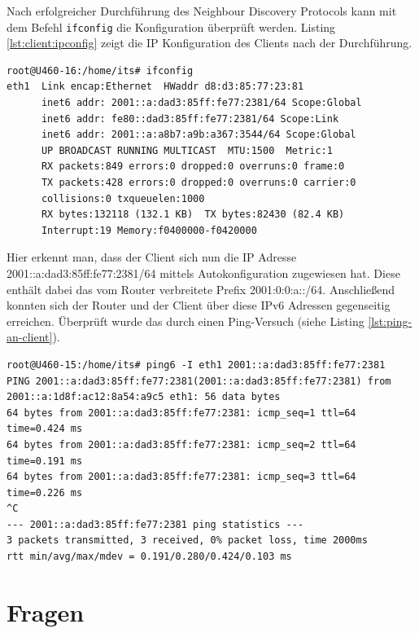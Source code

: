 \documentclass[a4paper,12pt]{article} %
\begin{document}
Nach erfolgreicher Durchführung des Neighbour Discovery Protocols kann mit dem Befehl \verb!ifconfig! die Konfiguration überprüft werden. Listing \ref{lst:client:ipconfig} zeigt die IP Konfiguration des Clients nach der Durchführung.

\begin{lstlisting}[style=code,caption={IP Konfiguration des Clients},label=lst:client:ipconfig]
root@U460-16:/home/its# ifconfig
eth1  Link encap:Ethernet  HWaddr d8:d3:85:77:23:81  
      inet6 addr: 2001::a:dad3:85ff:fe77:2381/64 Scope:Global
      inet6 addr: fe80::dad3:85ff:fe77:2381/64 Scope:Link
      inet6 addr: 2001::a:a8b7:a9b:a367:3544/64 Scope:Global
      UP BROADCAST RUNNING MULTICAST  MTU:1500  Metric:1
      RX packets:849 errors:0 dropped:0 overruns:0 frame:0
      TX packets:428 errors:0 dropped:0 overruns:0 carrier:0
      collisions:0 txqueuelen:1000 
      RX bytes:132118 (132.1 KB)  TX bytes:82430 (82.4 KB)
      Interrupt:19 Memory:f0400000-f0420000  
\end{lstlisting}

Hier erkennt man, dass der Client sich nun die IP Adresse 2001::a:dad3:85ff:fe77:2381/64 mittels Autokonfiguration zugewiesen hat. Diese enthält dabei das vom Router verbreitete Prefix 2001:0:0:a::/64.
Anschließend konnten sich der Router und der Client über diese IPv6 Adressen gegenseitig erreichen. Überprüft wurde das durch einen Ping-Versuch (siehe Listing \ref{lst:ping-an-client}).

\begin{lstlisting}[style=code,caption={Ping an Client},label=lst:ping-an-client]
root@U460-15:/home/its# ping6 -I eth1 2001::a:dad3:85ff:fe77:2381
PING 2001::a:dad3:85ff:fe77:2381(2001::a:dad3:85ff:fe77:2381) from 2001::a:1d8f:ac12:8a54:a9c5 eth1: 56 data bytes
64 bytes from 2001::a:dad3:85ff:fe77:2381: icmp_seq=1 ttl=64 time=0.424 ms
64 bytes from 2001::a:dad3:85ff:fe77:2381: icmp_seq=2 ttl=64 time=0.191 ms
64 bytes from 2001::a:dad3:85ff:fe77:2381: icmp_seq=3 ttl=64 time=0.226 ms
^C
--- 2001::a:dad3:85ff:fe77:2381 ping statistics ---
3 packets transmitted, 3 received, 0% packet loss, time 2000ms
rtt min/avg/max/mdev = 0.191/0.280/0.424/0.103 ms
\end{lstlisting}

\section{Fragen}
\end{document}

